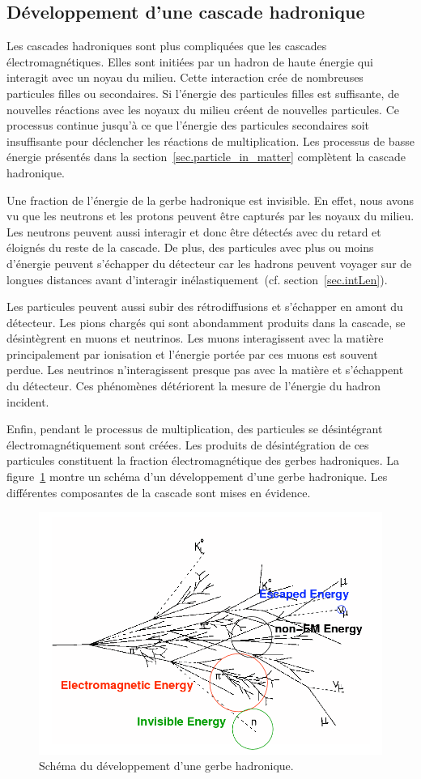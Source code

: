 \subsection{Développement d'une cascade hadronique}
Les cascades hadroniques sont plus compliquées que les cascades électromagnétiques. Elles sont initiées par un hadron de haute énergie qui interagit avec un noyau du milieu. Cette interaction crée de nombreuses particules filles ou secondaires. Si l'énergie des particules filles est suffisante, de nouvelles réactions avec les noyaux du milieu créent de nouvelles particules. Ce processus continue jusqu'à ce que l'énergie des particules secondaires soit insuffisante pour déclencher les réactions de multiplication. Les processus de basse énergie présentés dans la section~\ref{sec.particle_in_matter} complètent la cascade hadronique. 

Une fraction de l'énergie de la gerbe hadronique est invisible. En effet, nous avons vu que les neutrons et les protons peuvent être capturés par les noyaux du milieu. Les neutrons peuvent aussi interagir et donc être détectés avec du retard et éloignés du reste de la cascade. De plus, des particules avec plus ou moins d'énergie peuvent s'échapper du détecteur car les hadrons peuvent voyager sur de longues distances avant d'interagir inélastiquement~(cf. section~\ref{sec.intLen}). 

Les particules peuvent aussi subir des rétrodiffusions et s'échapper en amont du détecteur. Les pions chargés qui sont abondamment produits dans la cascade, se désintègrent en muons et neutrinos. Les muons interagissent avec la matière principalement par ionisation et l'énergie portée par ces muons est souvent perdue. Les neutrinos n'interagissent presque pas avec la matière et s'échappent du détecteur. Ces phénomènes détériorent la mesure de l'énergie du hadron incident. 

Enfin, pendant le processus de multiplication, des particules se désintégrant électromagnétiquement sont créées. Les produits de désintégration de ces particules constituent la fraction électromagnétique des gerbes hadroniques. La figure~\ref{fig:hadron_shower} montre un schéma d'un développement d'une gerbe hadronique. Les différentes composantes de la cascade sont mises en évidence.
\begin{figure}[!h]
  \begin{center}
    \includegraphics[width=.7\textwidth]{ShowerTh/figs/had-shower.png}
    \caption{Schéma du développement d'une gerbe hadronique.}
    \label{fig:hadron_shower}
  \end{center}
\end{figure}

